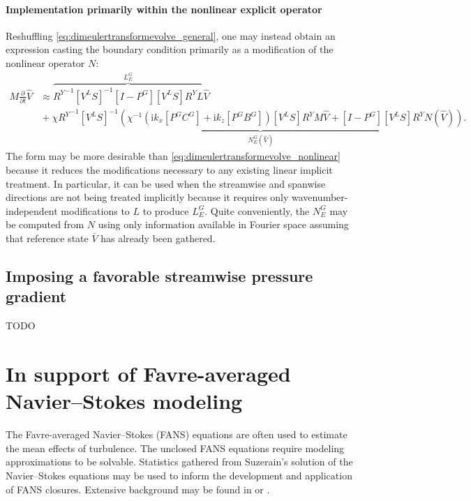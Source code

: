 \documentclass[letterpaper,11pt,nointlimits,reqno,draft]{amsbook}
\newcommand{\ii}{\ensuremath{\mathrm{i}}}
\begin{document}
\subsubsection{Implementation primarily within the nonlinear explicit operator}

Reshuffling \eqref{eq:dimeulertransformevolve_general}, one may instead obtain
an expression casting the boundary condition primarily as a modification of the
nonlinear operator $N$:
\begin{align}
\label{eq:dimeulertransformevolve_nonlinear}
  M \frac{\partial}{\partial{}t}
  \hat{V}
&\approx
\overbrace{
  {R^Y}^{-1}
  \left[V^L S\right]^{-1}
  \left[I-P^G\right] \left[V^L S\right] R^Y
  L
}^{L_E^G}
  \hat{V}
\\
&{}+
  \chi
\underbrace{
  {R^Y}^{-1}
  \left[V^L S\right]^{-1}
  \left(
    \chi^{-1}
    \left( \ii k_x \left[P^G C^G\right] + \ii k_z \left[P^G B^G\right] \right)
    \left[V^L S\right] R^Y M
    \hat{V}
    +
    \left[I - P^G\right] \left[V^L S\right] R^Y
    N(\hat{V})
  \right)
}_{N_E^G\left(\hat{V}\right)}
.
\end{align}
The form may be more desirable than
\eqref{eq:dimeulertransformevolve_nonlinear} because it reduces the
modifications necessary to any existing linear implicit treatment.  In
particular, it can be used when the streamwise and spanwise directions are not
being treated implicitly because it requires only wavenumber-independent
modifications to $L$ to produce $L_E^G$.  Quite conveniently, the $N_E^G$ may be
computed from $N$ using only information available in Fourier space assuming
that reference state $\bar{V}$ has already been gathered.

\section{Imposing a favorable streamwise pressure gradient}

TODO

\chapter{In support of Favre-averaged Navier--Stokes modeling}
\label{sec:supportFANS}

The Favre-averaged Navier--Stokes (FANS) equations are often used to estimate
the mean effects of turbulence.  The unclosed FANS equations require modeling
approximations to be solvable.  Statistics gathered from Suzerain's solution of
the Navier--Stokes equations may be used to inform the development and
application of FANS closures.  Extensive background may be found in
\citet{Chassaing2010} or \citet{SmitsDussauge2005}.
\end{document}
